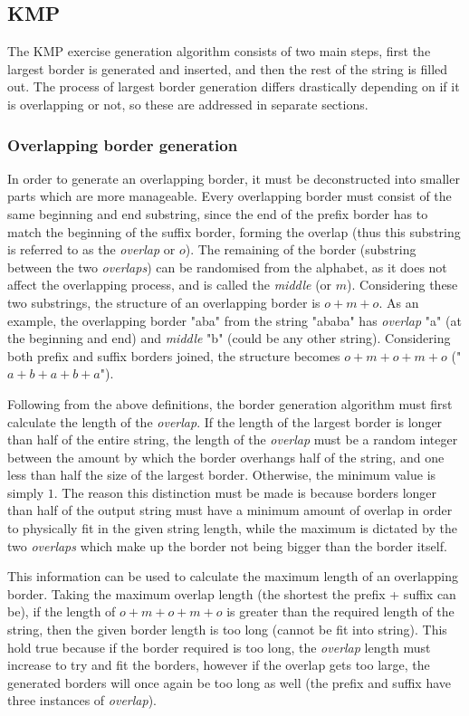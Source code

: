 \documentclass{l4proj}
\begin{document}
\subsection{KMP}
\label{sec:kgen}

The KMP exercise generation algorithm consists of two main steps, first the largest border is generated and inserted, and then the rest of the string is filled out. The process of largest border generation differs drastically depending on if it is overlapping or not, so these are addressed in separate sections.

\subsubsection{Overlapping border generation}
\label{sec:ob}

In order to generate an overlapping border, it must be deconstructed into smaller parts which are more manageable. Every overlapping border must consist of the same beginning and end substring, since the end of the prefix border has to match the beginning of the suffix border, forming the overlap (thus this substring is referred to as the \emph{overlap} or $o$). The remaining of the border (substring between the two \emph{overlaps}) can be randomised from the alphabet, as it does not affect the overlapping process, and is called the \emph{middle} (or $m$). Considering these two substrings, the structure of an overlapping border is $o+m+o$. As an example, the overlapping border "aba" from the string "ababa" has \emph{overlap} "a" (at the beginning and end) and \emph{middle} "b" (could be any other string). Considering both prefix and suffix borders joined, the structure becomes $o+m+o+m+o$ ("$a+b+a+b+a$").

Following from the above definitions, the border generation algorithm must first calculate the length of the \emph{overlap}. If the length of the largest border is longer than half of the entire string, the length of the \emph{overlap} must be a random integer between the amount by which the border overhangs half of the string, and one less than half the size of the largest border. Otherwise, the minimum value is simply $1$. The reason this distinction must be made is because borders longer than half of the output string must have a minimum amount of overlap in order to physically fit in the given string length, while the maximum is dictated by the two \emph{overlaps} which make up the border not being bigger than the border itself.

This information can be used to calculate the maximum length of an overlapping border. Taking the maximum overlap length (the shortest the prefix + suffix can be), if the length of $o+m+o+m+o$ is greater than the required length of the string, then the given border length is too long (cannot be fit into string). This hold true because if the border required is too long, the \emph{overlap} length must increase to try and fit the borders, however if the overlap gets too large, the generated borders will once again be too long as well (the prefix and suffix have three instances of \emph{overlap}).
\end{document}
